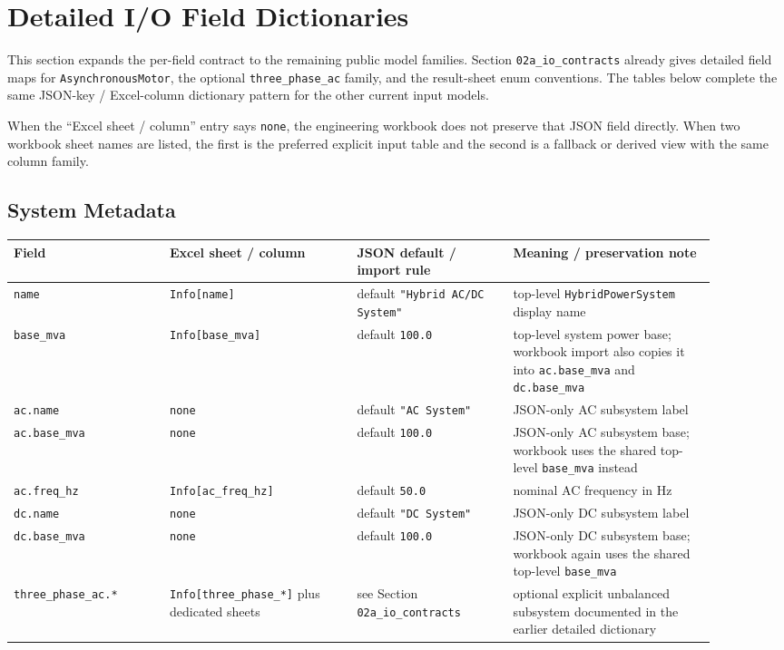 \section{Detailed I/O Field Dictionaries}

This section expands the per-field contract to the remaining public model
families.  Section \texttt{02a\_io\_contracts} already gives detailed field
maps for \texttt{AsynchronousMotor}, the optional \texttt{three\_phase\_ac}
family, and the result-sheet enum conventions.  The tables below complete the
same JSON-key / Excel-column dictionary pattern for the other current input
models.

When the ``Excel sheet / column'' entry says \texttt{none}, the engineering
workbook does not preserve that JSON field directly.  When two workbook sheet
names are listed, the first is the preferred explicit input table and the
second is a fallback or derived view with the same column family.

\subsection{System Metadata}

\footnotesize

\begin{longtable}{L{0.20\linewidth}L{0.24\linewidth}L{0.20\linewidth}L{0.26\linewidth}}
\toprule
Field & Excel sheet / column & JSON default / import rule & Meaning / preservation note \\
\midrule
\endhead
\texttt{name} & \texttt{Info[name]} & default \texttt{"Hybrid AC/DC System"} & top-level \texttt{HybridPowerSystem} display name \\
\texttt{base\_mva} & \texttt{Info[base\_mva]} & default \texttt{100.0} & top-level system power base; workbook import also copies it into \texttt{ac.base\_mva} and \texttt{dc.base\_mva} \\
\texttt{ac.name} & \texttt{none} & default \texttt{"AC System"} & JSON-only AC subsystem label \\
\texttt{ac.base\_mva} & \texttt{none} & default \texttt{100.0} & JSON-only AC subsystem base; workbook uses the shared top-level \texttt{base\_mva} instead \\
\texttt{ac.freq\_hz} & \texttt{Info[ac\_freq\_hz]} & default \texttt{50.0} & nominal AC frequency in Hz \\
\texttt{dc.name} & \texttt{none} & default \texttt{"DC System"} & JSON-only DC subsystem label \\
\texttt{dc.base\_mva} & \texttt{none} & default \texttt{100.0} & JSON-only DC subsystem base; workbook again uses the shared top-level \texttt{base\_mva} \\
\texttt{three\_phase\_ac.*} & \texttt{Info[three\_phase\_*]} plus dedicated sheets & see Section \texttt{02a\_io\_contracts} & optional explicit unbalanced subsystem documented in the earlier detailed dictionary \\
\bottomrule
\end{longtable}

